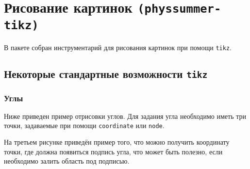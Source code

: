 \section{Рисование картинок \texttt{(physsummer-tikz)}}

В пакете собран инструментарий для рисования картинок при помощи \texttt{tikz}.



\subsection{Некоторые стандартные возможности \texttt{tikz}}

\subsubsection{Углы}

Ниже приведен пример отрисовки углов. Для задания угла необходимо иметь три точки, задаваемые при помощи
\texttt{coordinate} или \texttt{node}.

На третьем рисунке приведён пример того, что можно получить координату точки, где должна появиться
подпись угла, что может быть полезно, если необходимо залить область под подписью.

